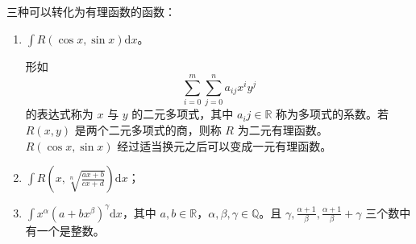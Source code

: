 \begin{proposition}
    三种可以转化为有理函数的函数：
    \begin{enumerate}
        \item $\int R(\cos x,\sin x)\mathrm{d}x$。

              形如
              \[\sum_{i = 0}^{m}\sum_{j = 0}^{n}a_{ij}x^{i}y^{j}\]
              的表达式称为 $x$ 与 $y$ 的二元多项式，其中 $a_ij \in \mathbb{R}$ 称为多项式的系数。若 $R(x,y)$ 是两个二元多项式的商，则称 $R$ 为二元有理函数。$R(\cos x,\sin x)$ 经过适当换元之后可以变成一元有理函数。
        \item $\int R(x,\sqrt[n]{\frac{ax + b}{cx +d}})\mathrm{d}x$；
        \item $\int x^{\alpha}(a + bx^{\beta})^{\gamma}\mathrm{d}x$，其中 $a,b \in \mathbb{R}$，$\alpha,\beta,\gamma \in \mathbb{Q}$。且 $\gamma,\frac{\alpha + 1}{\beta},\frac{\alpha + 1}{\beta} + \gamma$ 三个数中有一个是整数。
    \end{enumerate}
\end{proposition}





